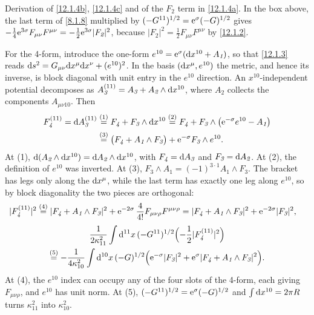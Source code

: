 \begin{tcolorbox}[breakable]
	\begin{remark}
		Derivation of \eqref{12.1.4b}, \eqref{12.1.4c} and of the $F_{\textit{2}}$ term in \eqref{12.1.4a}. In the box above, the last term of \eqref{8.1.8} multiplied by $(-G^{11})^{1/2}=\mathrm{e}^{\sigma}(-G)^{1/2}$ gives $-\frac14\mathrm{e}^{3\sigma}F_{\mu\nu}F^{\mu\nu}=-\frac12\mathrm{e}^{3\sigma}\lvert F_{\textit{2}}\rvert^{2}$, because $\lvert F_{\textit{2}}\rvert^{2}=\frac12F_{\mu\nu}F^{\mu\nu}$ by \eqref{12.1.2}.

		For the 4-form, introduce the one-form $e^{10}=\mathrm{e}^{\sigma}(\mathrm{d} x^{10}+A_{\textit{1}})$, so that \eqref{12.1.3} reads $\mathrm{d} s^{2}=G_{\mu\nu}\mathrm{d} x^{\mu}\mathrm{d} x^{\nu}+(e^{10})^{2}$. In the basis $(\mathrm{d} x^{\mu},e^{10})$ the metric, and hence its inverse, is block diagonal with unit entry in the $e^{10}$ direction. An $x^{10}$-independent potential decomposes as $A^{(11)}_{\textit{3}}=A_{\textit{3}}+A_{\textit{2}}\wedge\mathrm{d} x^{10}$, where $A_{\textit{2}}$ collects the components $A_{\mu\nu 10}$. Then
		\begin{align*}
			F^{(11)}_{\textit{4}}=\mathrm{d} A^{(11)}_{\textit{3}}
			&\overset{(1)}{=} F_{\textit{4}}+F_{\textit{3}}\wedge\mathrm{d} x^{10}
			\overset{(2)}{=} F_{\textit{4}}+F_{\textit{3}}\wedge\bigl(\mathrm{e}^{-\sigma}e^{10}-A_{\textit{1}}\bigr)\\
			&\overset{(3)}{=} \bigl(F_{\textit{4}}+A_{\textit{1}}\wedge F_{\textit{3}}\bigr)+\mathrm{e}^{-\sigma}F_{\textit{3}}\wedge e^{10} .
		\end{align*}
		At (1), $\mathrm{d}(A_{\textit{2}}\wedge\mathrm{d} x^{10})=\mathrm{d} A_{\textit{2}}\wedge\mathrm{d} x^{10}$, with $F_{\textit{4}}=\mathrm{d} A_{\textit{3}}$ and $F_{\textit{3}}=\mathrm{d} A_{\textit{2}}$. At (2), the definition of $e^{10}$ was inverted. At (3), $F_{\textit{3}}\wedge A_{\textit{1}}=(-1)^{3\cdot1}A_{\textit{1}}\wedge F_{\textit{3}}$. The bracket has legs only along the $\mathrm{d} x^{\mu}$, while the last term has exactly one leg along $e^{10}$, so by block diagonality the two pieces are orthogonal:
		\begin{align*}
			\lvert F^{(11)}_{\textit{4}}\rvert^{2}
			&\overset{(4)}{=} \lvert F_{\textit{4}}+A_{\textit{1}}\wedge F_{\textit{3}}\rvert^{2}+\mathrm{e}^{-2\sigma}\,\frac{4}{4!}F_{\mu\nu\rho}F^{\mu\nu\rho}
			=\lvert F_{\textit{4}}+A_{\textit{1}}\wedge F_{\textit{3}}\rvert^{2}+\mathrm{e}^{-2\sigma}\lvert F_{\textit{3}}\rvert^{2} ,
		\end{align*}
		\begin{multline*}
			\frac{1}{2\kappa_{11}^{2}}\int\mathrm{d}^{11}x\,(-G^{11})^{1/2}\Bigl(-\frac12\lvert F^{(11)}_{\textit{4}}\rvert^{2}\Bigr)\\
			\overset{(5)}{=} -\frac{1}{4\kappa_{10}^{2}}\int\mathrm{d}^{10}x\,(-G)^{1/2}\Bigl(\mathrm{e}^{-\sigma}\lvert F_{\textit{3}}\rvert^{2}+\mathrm{e}^{\sigma}\lvert F_{\textit{4}}+A_{\textit{1}}\wedge F_{\textit{3}}\rvert^{2}\Bigr) .
		\end{multline*}
		At (4), the $e^{10}$ index can occupy any of the four slots of the 4-form, each giving $F_{\mu\nu\rho}$, and $e^{10}$ has unit norm. At (5), $(-G^{11})^{1/2}=\mathrm{e}^{\sigma}(-G)^{1/2}$ and $\int\mathrm{d} x^{10}=2\pi R$ turns $\kappa_{11}^{2}$ into $\kappa_{10}^{2}$.


\end{remark}
\end{tcolorbox}
